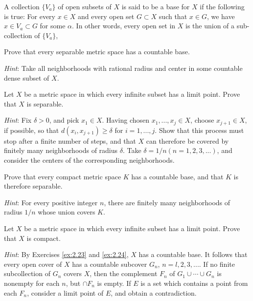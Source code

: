 \begin{myExercise}
    \label{ex:2.23}
    A collection $\{V_a\}$ of open subsets of $X$ is said to be a base for $X$ 
    if the following is true: 
    For every $x \in X$ and every open set $G \subset X$ such that $x \in G$, 
    we have $x \in V_a \subset G$ for some $\alpha$. 
    In other words, every open set in $X$ is the union of a 
    sub-collection of $\{V_a\}$,
    
    Prove that every separable metric space has a countable base. 

    \emph{Hint}: Take all neighborhoods with rational radius 
    and center in some countable dense subset of $X$.
\end{myExercise}

\begin{myExercise}
    \label{ex:2.24}
    Let $X$ be a metric space in which every infinite subset has a limit point. 
    Prove that $X$ is separable. 
    
    \emph{Hint}: Fix $\delta > 0$, and pick $x_1 \in X$. 
    Having chosen $x_1, ... , x_j \in X$,
    choose $x_{j+1} \in X$, 
    if possible, so that $d(x_i, x_{j+1})\geq \delta$ for $i = 1, ... ,j$. 
    Show that this process must stop after a finite number of steps, 
    and that $X$ can therefore be covered by finitely many neighborhoods of radius $\delta$. 
    Take $\delta = 1/n (n = 1, 2, 3, ... )$, 
    and consider the centers of the corresponding neighborhoods.
\end{myExercise}


\begin{myExercise}
    \label{ex:2.25}
    Prove that every compact metric space $K$ has a countable base, 
    and that $K$ is therefore separable. 
    
    \emph{Hint}: For every positive integer $n$, 
    there are finitely many neighborhoods of radius $1/n$ whose union covers $K$.
\end{myExercise}


\begin{myExercise}
    \label{ex:2.26}
    Let $X$ be a metric space in which every infinite subset has a limit point. 
    Prove that $X$ is compact. 
    
    \emph{Hint}: By Exercises \ref{ex:2.23} and \ref{ex:2.24}, 
    $X$ has a countable base. 
    It follows that every open cover of $X$ has a countable subcover ${G_n}$, $n = l, 2, 3, ...$.
    If no finite subcollection of ${G_n}$ covers $X$, 
    then the complement $F_n$ of $G_1 \cup \cdots \cup G_n$
    is nonempty for each $n$, but $\cap F_n$ is empty. 
    If $E$ is a set which contains a point from each $F_n$, 
    consider a limit point of $E$, and obtain a contradiction.
\end{myExercise}


